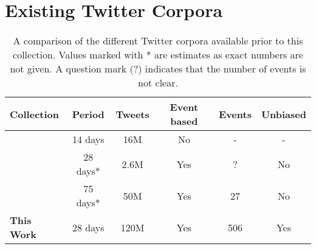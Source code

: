 

\section{Existing Twitter Corpora}
\label{collection:sec:background}

\begin{table}[hb]
	\centering

	\caption[A comparison of the different Twitter corpora available prior to Events 2012 corpus.]{A comparison of the different Twitter corpora available prior to this collection. Values marked with * are estimates as exact numbers are not given. A question mark (?) indicates that the number of events is not clear.}
	\label{table:collectionsCompared}

	\begin{tabulary}{\textwidth}{lccccc}

	\toprule
	\textbf{Collection} & \textbf{Period} & \textbf{Tweets} & \textbf{Event based} & \textbf{Events} & \textbf{Unbiased} \\
	\midrule

	\cite{McCreadie:2012:BRT:2348283.2348495} & 14 days & 16M & No & - & - \\
	\cite{Becker:2012:ICP:2124295.2124360} & 28 days* & 2.6M & Yes & ? & No \\
	\cite{Petrovic:2012:UPI:2382029.2382072} & 75 days* & 50M & Yes & 27 & No \\
	\textbf{This Work} 	& 28 days & 120M & Yes & 506 & Yes \\

	\bottomrule
	\end{tabulary}

\end{table}

